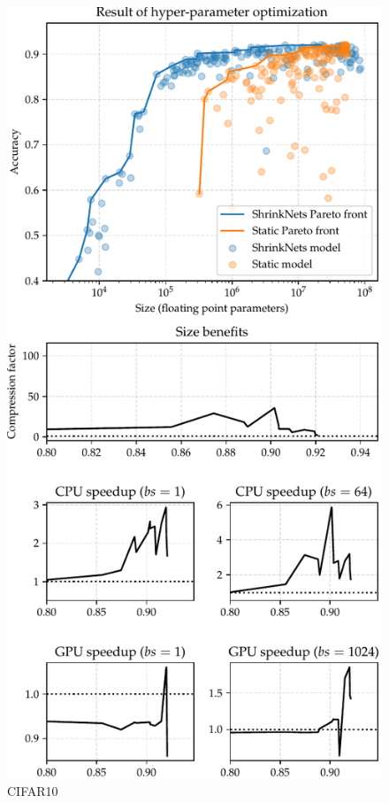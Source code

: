 \begin{figure}
\begin{center}
\end{center}
\vspace*{-4mm}
\end{figure}

\begin{figure}
\begin{center}
\includegraphics[width=\columnwidth]{CIFAR10_VGG_summary}
\vspace*{-5mm}
\caption{CIFAR10}
\end{center}
\vspace*{-4mm}
\end{figure}

